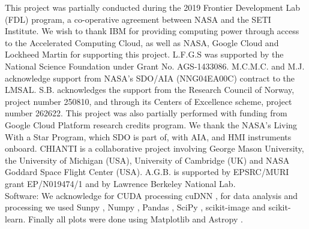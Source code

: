 \documentclass{aa}
\begin{document}
\begin{acknowledgements}

{This project was partially conducted during the 2019 Frontier Development Lab (FDL) program, a co-operative agreement between NASA and the SETI Institute. We wish to thank IBM for providing computing power through access to the Accelerated Computing Cloud, as well as NASA, Google Cloud and Lockheed Martin for supporting this project. L.F.G.S was supported by the National Science Foundation under Grant No. AGS-1433086. M.C.M.C. and M.J. acknowledge support from NASA’s SDO/AIA (NNG04EA00C) contract to the LMSAL. S.B.  acknowledges the support from the Research Council of Norway, project number 250810, and through its Centers of Excellence scheme, project number 262622. This project was also partially performed with funding from Google Cloud Platform research credits program. We thank the NASA’s Living With a Star Program, which SDO is part of, with AIA, and HMI instruments onboard. CHIANTI is a collaborative project involving George Mason University, the University of Michigan (USA), University of Cambridge (UK) and NASA Goddard Space Flight Center (USA). A.G.B. is supported by EPSRC/MURI grant EP/N019474/1 and by Lawrence Berkeley National Lab.\\

Software: We acknowledge for CUDA processing cuDNN \citep{cudnn}, for data analysis and processing we used Sunpy \citep[][]{Sunpy2020}, Numpy \citep{numpy}, Pandas \citep{pandas}, SciPy \citep{scipy}, scikit-image \citep{scikit-image} and scikit-learn\citep{scikit-learn}. Finally all plots were done using Matplotlib \citep{matplotlib} and Astropy \citep{astropy:2018}}.
\end{acknowledgements}



\end{document}
